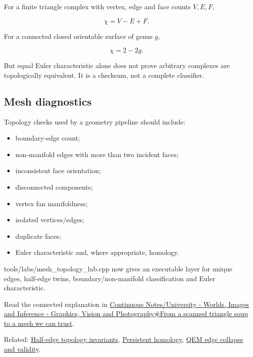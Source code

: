 For a finite triangle complex with vertex, edge and face counts \(V,E,F\),

\[
\chi=V-E+F.
\]

For a connected closed orientable surface of genus \(g\),

\[
\chi=2-2g.
\]

But equal Euler characteristic alone does not prove arbitrary complexes are topologically equivalent. It is a checksum, not a complete classifier.

\subsection{Mesh diagnostics}\label{appendix-e38976cbbf86-mesh-diagnostics}

Topology checks used by a geometry pipeline should include:

\begin{itemize}
\tightlist
\item
  boundary-edge count;
\item
  non-manifold edges with more than two incident faces;
\item
  inconsistent face orientation;
\item
  disconnected components;
\item
  vertex fan manifoldness;
\item
  isolated vertices/edges;
\item
  duplicate faces;
\item
  Euler characteristic and, where appropriate, homology.
\end{itemize}

tools/labs/mesh\_topology\_lab.cpp now gives an executable layer for unique edges, half-edge twins, boundary/non-manifold classification and Euler characteristic.

Read the connected explanation in \hyperref[03-visual-computing-i-ch002-from-a-scanned-triangle-soup-to-a-mesh-we-can-trust]{Continuous Notes/University - Worlds, Images and Inference - Graphics, Vision and Photography\#From a scanned triangle soup to a mesh we can trust}.

Related: \hyperref[appendix-faac749c9cdd]{Half-edge topology invariants}, \hyperref[appendix-e4d8ed8d6787]{Persistent homology}, \hyperref[appendix-89db9fe1bc8a]{QEM edge collapse and validity}.
